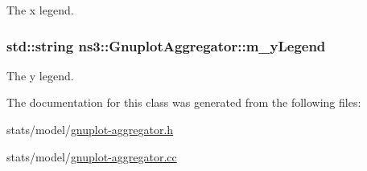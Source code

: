 The x legend. 

\subsubsection[{\texorpdfstring{m\+\_\+y\+Legend}{m_yLegend}}]{\setlength{\rightskip}{0pt plus 5cm}std\+::string ns3\+::\+Gnuplot\+Aggregator\+::m\+\_\+y\+Legend\hspace{0.3cm}{\ttfamily [private]}}\hypertarget{classns3_1_1GnuplotAggregator_a3219ced94e278496e0b6cf69f251ad85}{}\label{classns3_1_1GnuplotAggregator_a3219ced94e278496e0b6cf69f251ad85}


The y legend. 



The documentation for this class was generated from the following files\+:\begin{DoxyCompactItemize}
\item 
stats/model/\hyperlink{gnuplot-aggregator_8h}{gnuplot-\/aggregator.\+h}\item 
stats/model/\hyperlink{gnuplot-aggregator_8cc}{gnuplot-\/aggregator.\+cc}\end{DoxyCompactItemize}
